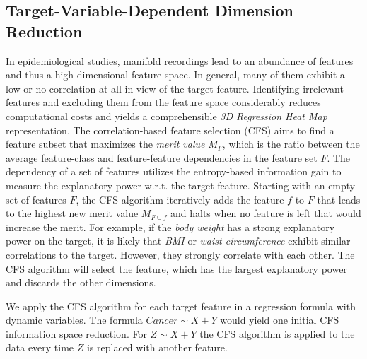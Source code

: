\documentclass[journal]{style/vgtc} 			          %
\begin{document}
\subsection{Target-Variable-Dependent Dimension Reduction}
In epidemiological studies, manifold recordings lead to an abundance of features and thus a high-dimensional feature space.
In general, many of them exhibit a low or no correlation at all in view of the target feature.
Identifying irrelevant features and excluding them from the feature space considerably reduces computational costs and yields a comprehensible \emph{3D Regression Heat Map} representation.
The correlation-based feature selection (CFS) \cite{CFS} aims to find a feature subset that maximizes the \emph{merit value} $M_F$, which is the ratio between the average feature-class and feature-feature dependencies in the feature set $F$.
The dependency of a set of features utilizes the entropy-based information gain to measure the explanatory power w.r.t. the target feature.
Starting with an empty set of features $F$, the CFS algorithm iteratively adds the feature $f$ to $F$ that leads to the highest new merit value $M_{F\cup f}$ and halts when no feature is left that would increase the merit.
For example, if the \emph{body weight} has a strong explanatory power on the target, it is likely that \emph{BMI} or \emph{waist circumference} exhibit similar correlations to the target.
However, they strongly correlate with each other.
The CFS algorithm will select the feature, which has the largest explanatory power and discards the other dimensions.

We apply the CFS algorithm for each target feature in a regression formula with dynamic variables.
The formula $Cancer \sim X + Y$ would yield one initial CFS information space reduction.
For $Z \sim X + Y$ the CFS algorithm is applied to the data every time $Z$ is replaced with another feature.
\end{document}
